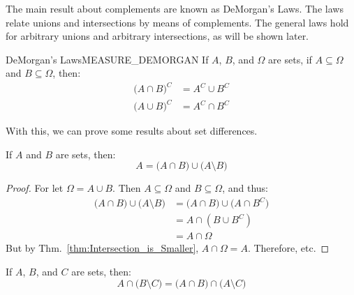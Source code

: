         The main result about complements are known as
        DeMorgan's Laws. The laws relate unions and
        intersections by means of complements. The general
        laws hold for arbitrary unions and arbitrary
        intersections, as will be shown later.
        \begin{ftheorem}{DeMorgan's Laws}{MEASURE_DEMORGAN}
            If $A$, $B$, and $\Omega$ are sets, if
            $A\subseteq\Omega$ and $B\subseteq\Omega$, then:
            \begin{subequations}
                \begin{align}
                    \big(A\cap{B}\big)^{C}
                    &=A^{C}\cup{B}^{C}\\
                    \big(A\cup{B}\big)^{C}
                    &=A^{C}\cap{B}^{C}
                \end{align}
            \end{subequations}
        \end{ftheorem}
        With this, we can prove some results about
        set differences.
        \begin{theorem}
            If $A$ and $B$ are sets, then:
            \begin{equation}
                A=\big(A\cap{B}\big)
                    \cup\big(A\setminus{B}\big)
            \end{equation}
        \end{theorem}
        \begin{proof}
            For let $\Omega=A\cup{B}$. Then
            $A\subseteq\Omega$ and $B\subseteq\Omega$,
            and thus:
            \begin{subequations}
                \begin{align}
                    \big(A\cap{B})\cup\big(A\setminus{B}\big)
                    &=\big(A\cap{B}\big)
                        \cup\big(A\cap{B}^{C}\big)\\
                    &=A\cap(B\cup{B}^{C})\\
                    &=A\cap\Omega
                \end{align}
            \end{subequations}
            But by Thm.~\ref{thm:Intersection_is_Smaller},
            $A\cap\Omega=A$. Therefore, etc.
        \end{proof}
        \begin{theorem}
            If $A$, $B$, and $C$ are sets, then:
            \begin{equation}
                A\cap\big(B\setminus{C}\big)
                =\big(A\cap{B}\big)\cap\big(A\setminus{C}\big)
            \end{equation}
        \end{theorem}
